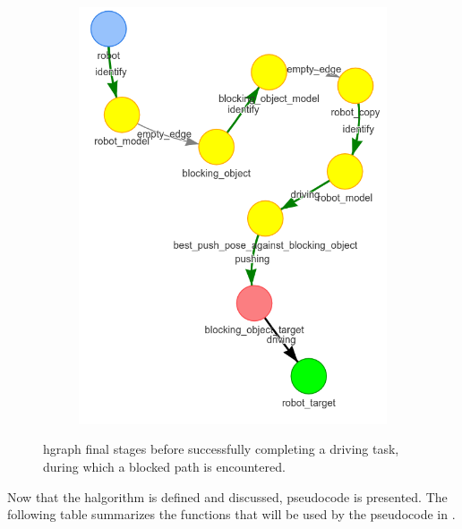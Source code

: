 \begin{figure}[H]
\begin{subfigure}{.3\textwidth}
    \includegraphics[width=\textwidth]{figures/proposed_method/connecting_nodes/blocking_obj/blocking_obj_6}
    \caption{}\label{subfig:blocking_obj_6}
  \end{subfigure}
  \caption{\ac{hgraph} final stages before successfully completing a driving task, during which a blocked path is encountered.}%
  \label{fig:blocking_obj_hgraph_two}
\end{figure}

Now that the \ac{halgorithm} is defined and discussed, pseudocode is presented. The following table summarizes the functions that will be used by the pseudocode in .\bs


